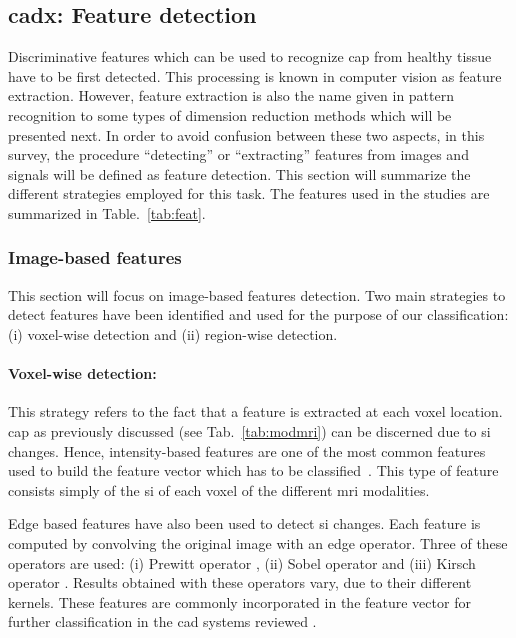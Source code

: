 \subsection{\Ac{cadx}: Feature detection} \label{subsec:chp3:img-clas:CADX-fea-dec}

Discriminative features which can be used to recognize \ac{cap} from healthy tissue have to be first detected.
This processing is known in computer vision as feature extraction. 
However, feature extraction is also the name given in pattern recognition to some types of dimension reduction methods which will be presented next.
In order to avoid confusion between these two aspects, in this survey, the procedure ``detecting'' or ``extracting'' features from images and signals will be defined as feature detection.
This section will summarize the different strategies employed for this task.
The features used in the studies are summarized in Table.~\ref{tab:feat}.  

\subsubsection{Image-based features}\label{subsubsec:chp3:img-clas:CADX-fea-dec:Img-fea}

This section will focus on image-based features detection.
Two main strategies to detect features have been identified and used for the purpose of our classification: (i) voxel-wise detection and (ii) region-wise detection.

\paragraph{Voxel-wise detection:}
This strategy refers to the fact that a feature is extracted at each voxel location.
\ac{cap} as previously discussed (see Tab.~\ref{tab:modmri}) can be discerned due to \ac{si} changes.
Hence, intensity-based features are one of the most common features used to build the feature vector which has to be classified~\cite{Ampeliotis2007,Ampeliotis2008,Artan2009,Artan2010,Chan2003,Langer2009,Liu2009,Niaf2011,Niaf2012,Viswanath2008a,Viswanath2011}.
This type of feature consists simply of the \ac{si} of each voxel of the different \ac{mri} modalities.

Edge based features have also been used to detect \ac{si} changes.
Each feature is computed by convolving the original image with an edge operator.
Three of these operators are used: (i) Prewitt operator \cite{Prewitt1970}, (ii) Sobel operator \cite{Sobel1970} and (iii) Kirsch operator \cite{Kirsch1971}.
Results obtained with these operators vary, due to their different kernels.
These features are commonly incorporated in the feature vector for further classification in the \ac{cad} systems reviewed \cite{Niaf2011,Niaf2012,Tiwari2009a,Tiwari2010,Tiwari2013,Viswanath2008,Viswanath2011}.

